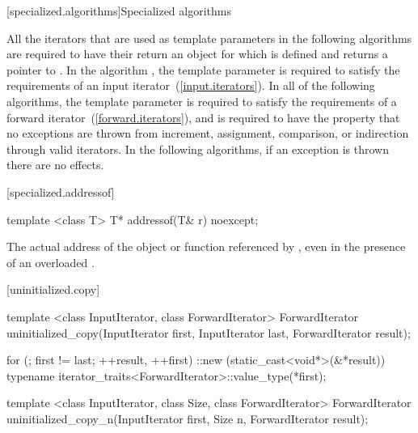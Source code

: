 [specialized.algorithms]{Specialized algorithms}

\pnum
All the iterators that are used as template parameters in the following
algorithms are required to  have their  return an object
for which  is defined and returns a pointer to .
In the algorithm , the template parameter
 is required to satisfy the requirements of an input
iterator~(\ref{input.iterators}). In all of the following algorithms,
the template parameter  is required to satisfy the
requirements of a forward iterator~(\ref{forward.iterators}),
and is required to have the property that no exceptions are thrown
from increment, assignment, comparison, or indirection through valid iterators.
In the following algorithms, if an exception is thrown there are no effects.

[specialized.addressof]{}

%
\begin{itemdecl}
template <class T> T* addressof(T& r) noexcept;
\end{itemdecl}

\begin{itemdescr}
\pnum
\returns The actual address of the object or function referenced by , even in the
presence of an overloaded .
\end{itemdescr}


[uninitialized.copy]{}

%
\begin{itemdecl}
template <class InputIterator, class ForwardIterator>
  ForwardIterator uninitialized_copy(InputIterator first, InputIterator last,
                                     ForwardIterator result);
\end{itemdecl}

\begin{itemdescr}
\pnum
\effects
\begin{codeblock}
for (; first != last; ++result, ++first)
  ::new (static_cast<void*>(&*result))
    typename iterator_traits<ForwardIterator>::value_type(*first);
\end{codeblock}

\pnum
\returns
{}
\end{itemdescr}

%
\begin{itemdecl}
template <class InputIterator, class Size, class ForwardIterator>
  ForwardIterator uninitialized_copy_n(InputIterator first, Size n,
                                       ForwardIterator result);
\end{itemdecl}

